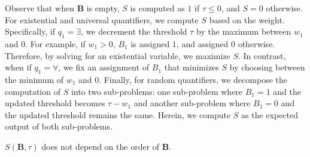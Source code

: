
Observe that when $ \textbf{B} $ is empty, $S$ is computed as $ 1 $ if $ \tau \le 0 $, and  $ S = 0 $ otherwise. For  existential and universal quantifiers, we compute $ S $ based on the weight. Specifically, if $ q_1 = \exists $, we decrement the threshold $ \tau $ by the maximum between $ w_1 $ and $ 0 $. For example, if $ w_1 > 0 $, $ B_1 $ is assigned $ 1 $, and assigned $ 0 $ otherwise. Therefore, by solving for an existential variable, we  maximize $ S $. In contrast, when if $ q_1 = \forall $, we fix an assignment of $ B_1 $ that minimizes $ S $ by choosing between the minimum of $ w_1 $ and $ 0 $. Finally, for random quantifiers, we decompose the computation of $S$ into two sub-problems: one sub-problem where $ B_1 = 1 $ and the updated threshold becomes $ \tau - w_1 $ and another sub-problem where $ B_1 = 0 $ and the updated threshold remains the same. Herein, we compute $ S $ as the expected output of both sub-problems.

\begin{remark}
	\label{fvgm_lm:property_s3p}
	$ S(\mathbf{B},\tau) $ does not depend on the order of $ \mathbf{B} $.
\end{remark}

